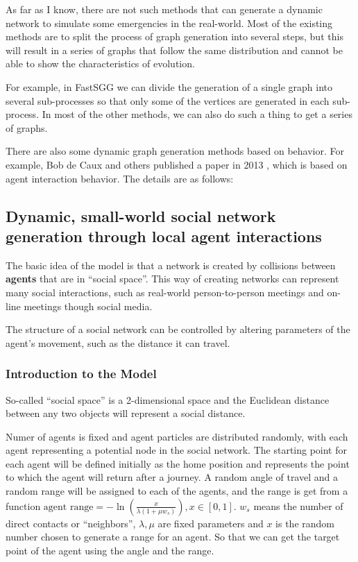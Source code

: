 \begin{survey}
As far as I know, there are not such methods that can generate a dynamic
network to simulate some emergencies in the real-world. Most of the
existing methods are to split the process of graph generation into
several steps, but this will result in a series of graphs that follow
the same distribution and cannot be able to show the characteristics of
evolution.

For example, in FastSGG we can divide the generation of a single graph
into several sub-processes so that only some of the vertices are
generated in each sub-process. In most of the other methods, we can also
do such a thing to get a series of graphs.

There are also some dynamic graph generation methods based on behavior.
For example, Bob de Caux and others published a paper in 2013 \cite{De2014Dynamic}, which is based on
agent interaction behavior. The details are as follows:

\subsection{Dynamic, small-world social network generation through
local agent interactions\cite{De2014Dynamic}}

The basic idea of the model is that a network is created by collisions
between \textbf{agents} that are in “social space”. This way of
creating networks can represent many social interactions, such as
real-world person-to-person meetings and on-line meetings though social
media.

The structure of a social network can be controlled by altering
parameters of the agent's movement, such as the distance it can travel.

\subsubsection{Introduction to the Model}

So-called “social space” is a 2-dimensional space and the Euclidean
distance between any two objects will represent a social distance.

Numer of agents is fixed and agent particles are distributed randomly,
with each agent representing a potential node in the social network. The
starting point for each agent will be defined initially as the home
position and represents the point to which the agent will return after a
journey. A random angle of travel and a random range will be assigned to
each of the agents, and the range is get from a function
\(\text{agent range} =-\ln \left(\frac{x}{\lambda\left(1+\mu w_{s}\right)}\right), x\in [0,1]\).
\(w_s\) means the number of direct contacts or “neighbors”,
\(\lambda, \mu\) are fixed parameters and \(x\) is the random number
chosen to generate a range for an agent. So that we can get the target
point of the agent using the angle and the range.


\end{survey}
